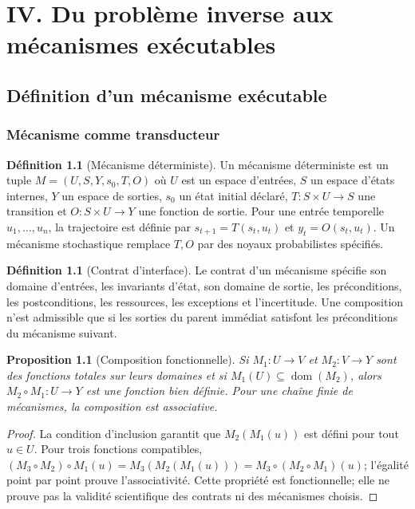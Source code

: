 \documentclass[11pt,oneside]{book}
\newtheorem{proposition}[theoreme]{Proposition}
\theoremstyle{definition}
\newtheorem{definition}[theoreme]{Définition}
\theoremstyle{remark}
\newcommand{\1}{\mathbf 1}
\begin{document}
\part{IV. Du problème inverse aux mécanismes exécutables}

\chapter{Définition d'un mécanisme exécutable}
\section{Mécanisme comme transducteur}
\begin{definition}[Mécanisme déterministe]
Un mécanisme déterministe est un tuple $M=(U,S,Y,s_0,T,O)$ où $U$ est un espace d'entrées, $S$ un espace d'états internes, $Y$ un espace de sorties, $s_0$ un état initial déclaré, $T:S\times U\to S$ une transition et $O:S\times U\to Y$ une fonction de sortie. Pour une entrée temporelle $u_1,\ldots,u_n$, la trajectoire est définie par $s_{t+1}=T(s_t,u_t)$ et $y_t=O(s_t,u_t)$. Un mécanisme stochastique remplace $T,O$ par des noyaux probabilistes spécifiés.
\end{definition}

\begin{definition}[Contrat d'interface]
Le contrat d'un mécanisme spécifie son domaine d'entrées, les invariants d'état, son domaine de sortie, les préconditions, les postconditions, les ressources, les exceptions et l'incertitude. Une composition n'est admissible que si les sorties du parent immédiat satisfont les préconditions du mécanisme suivant.
\end{definition}

\begin{proposition}[Composition fonctionnelle]
Si $M_1:U\to V$ et $M_2:V\to Y$ sont des fonctions totales sur leurs domaines et si $M_1(U)\subseteq\operatorname{dom}(M_2)$, alors $M_2\circ M_1:U\to Y$ est une fonction bien définie. Pour une chaîne finie de mécanismes, la composition est associative.
\end{proposition}
\begin{proof}
La condition d'inclusion garantit que $M_2(M_1(u))$ est défini pour tout $u\in U$. Pour trois fonctions compatibles, $(M_3\circ M_2)\circ M_1(u)=M_3(M_2(M_1(u)))=M_3\circ(M_2\circ M_1)(u)$; l'égalité point par point prouve l'associativité. Cette propriété est fonctionnelle; elle ne prouve pas la validité scientifique des contrats ni des mécanismes choisis.
\end{proof}
\end{document}
